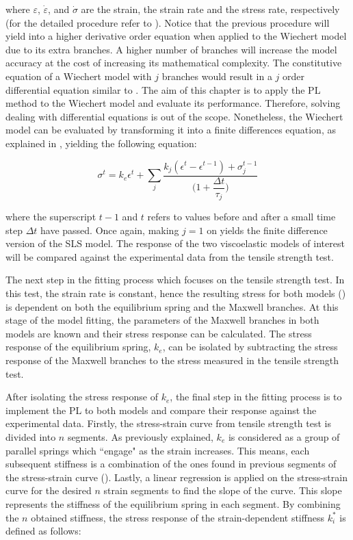 \noindent where $\varepsilon$, $\dot{\varepsilon}$, and $\dot{\sigma}$ are the strain, the strain rate and the stress rate, respectively (for the detailed procedure refer to \cite{roylance2001engineering}). Notice that the previous procedure will yield into a higher derivative order equation when applied to the Wiechert model due to its extra branches. A higher number of branches will increase the model accuracy at the cost of increasing its mathematical complexity. The constitutive equation of a Wiechert model with $j$ branches would result in a $j$ order differential equation similar to . The aim of this chapter is to apply the PL method to the Wiechert model and evaluate its performance. Therefore, solving dealing with differential equations is out of the scope. Nonetheless, the Wiechert model can be evaluated by transforming it into a finite differences equation, as explained in \cite{roylance2001engineering}, yielding the following equation:

\begin{equation}
    \label{eq4}
    \sigma^t = k_e\epsilon^t + \sum_j \frac{k_j(\epsilon^t - \epsilon^{t-1}) + \sigma_j^{t-1}}{\bigg(1+\dfrac{\Delta t}{\tau_j}\bigg)}
\end{equation}

\noindent where the superscript $t-1$ and $t$ refers to values before and after a small time step $\Delta t$ have passed. Once again, making $j=1$ on  yields the finite difference version of the SLS model. The response of the two viscoelastic models of interest will be compared against the experimental data from the tensile strength test.

The next step in the fitting process which focuses on the tensile strength test. In this test, the strain rate is constant, hence the resulting stress for both models () is dependent on both the equilibrium spring and the Maxwell branches. At this stage of the model fitting, the parameters of the Maxwell branches in both models are known and their stress response can be calculated. The stress response of the equilibrium spring, $k_e$, can be isolated by subtracting the stress response of the Maxwell branches to the stress measured in the tensile strength test. 

After isolating the stress response of $k_e$, the final step in the fitting process is to implement the PL to both models and compare their response against the experimental data. Firstly, the stress-strain curve from tensile strength test is divided into $n$ segments. As previously explained, $k_e$ is considered as a group of parallel springs which ``engage" as the strain increases. This means, each subsequent stiffness is a combination of the ones found in previous segments of the stress-strain curve ().  Lastly, a linear regression is applied on the stress-strain curve for the desired $n$ strain segments to find the slope of the curve. This slope represents the stiffness of the equilibrium spring in each segment. By combining the $n$ obtained stiffness, the stress response of the strain-dependent stiffness $k_i^*$ is defined as follows:

